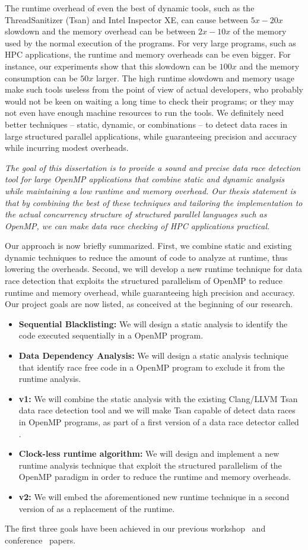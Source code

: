 The runtime overhead of even the best of dynamic
tools, such as the ThreadSanitizer (Tsan) and
Intel Inspector XE, can cause between $5x-20x$ slowdown and the memory
overhead can be between $2x-10x$ of the memory used by the normal execution of
the programs.
%
For very large programs, such as HPC applications, the runtime and memory
overheads can be even bigger.
%
For instance, our experiments show that this slowdown can be $100x$
and the memory consumption can be $50x$ larger.
%
The high runtime slowdown and memory usage make such tools useless from the
point of view of actual developers, who probably would not be keen on waiting a
long time to check their programs; or they may not even have enough machine
resources to run the tools.
%
We definitely need better techniques --  static, dynamic, or combinations -- 
to detect data
races in large structured parallel applications, while guaranteeing precision and
accuracy while incurring modest overheads.

\emph{The goal of this dissertation is to provide a sound and precise data
  race detection tool for large OpenMP applications that combine static and
  dynamic analysis while maintaining a low runtime and memory overhead.
  Our thesis statement is that by combining the best of these techniques 
  and tailoring the implementation to the actual concurrency structure of
  structured parallel languages such as OpenMP, we can make data race checking
 of HPC applications practical.}


Our approach is now briefly summarized.
%
First, we combine static and existing dynamic techniques to reduce the amount
of code to analyze at runtime, thus lowering the overheads.
%
Second, we will develop a new runtime technique for data race detection that
exploits the structured parallelism of OpenMP to reduce runtime and memory
overhead, while guaranteeing high precision and accuracy.
%
Our project goals are now listed, as conceived at the beginning of our
research.

\begin{itemize}
\item \textbf{Sequential Blacklisting:} We will design a static analysis to
  identify the code executed sequentially in a OpenMP program.
\item \textbf{Data Dependency Analysis:} We will design a static analysis
  technique that identify race free code in a OpenMP program to exclude it
  from the runtime analysis.
\item \textbf{\archer v1:} We will combine the static analysis with the
  existing Clang/LLVM Tsan data race detection tool and we will make Tsan
  capable of detect data races in OpenMP programs, as part of a first version
  of a data race detector called \archer.
\item \textbf{Clock-less runtime algorithm:} We will design and implement a
  new runtime analysis technique that exploit the structured parallelism of
  the OpenMP paradigm in order to reduce the runtime and memory overheads.
\item \textbf{\archer v2:} We will embed the aforementioned new runtime
  technique in a second version of \archer as a replacement of the \tsan
  runtime.
\end{itemize}

The first three goals have been achieved in our previous
workshop~\cite{Protze:2014:TPL:2688361.2688369} and
conference~\cite{atzeni2016} papers.

